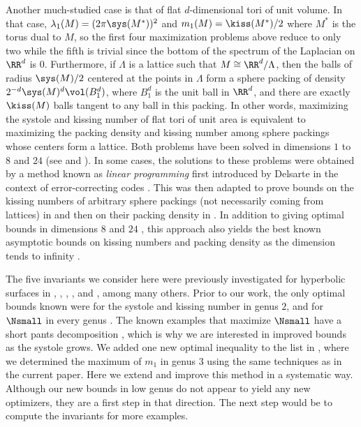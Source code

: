 \documentclass[12pt]{amsart}
\numberwithin{equation}{section}
\begin{document}
Another much-studied case is that of flat $d$-dimensional tori of unit volume. In that case, $\lambda_1(M)=(2\pi \sys(M^*))^2$ and $m_1(M)=\kiss(M^*)/2$ where $M^*$ is the torus dual to $M$, so the first four maximization problems above reduce to only two while the fifth is trivial since the bottom of the spectrum of the Laplacian on $\RR^d$ is $0$. Furthermore, if $\Lambda$ is a lattice such that $M \cong \RR^d / \Lambda$, then the balls of radius $\sys(M)/2$ centered at the points in $\Lambda$ form a sphere packing of density $2^{-d}\sys(M)^d \vol(B_1^d)$, where $B_1^d$ is the unit ball in $\RR^d$, and there are exactly $\kiss(M)$ balls tangent to any ball in this packing. In other words, maximizing the systole and kissing number of flat tori of unit area is equivalent to maximizing the packing density and kissing number among sphere packings whose centers form a lattice. Both problems have been solved in dimensions $1$ to $8$ and $24$ (see \cite[Table 1.1]{ConwaySloane} and \cite{CohnKumar}). In some cases, the solutions to these problems were obtained by a method known as \emph{linear programming} first introduced by Delsarte in the context of error-correcting codes \cite{Delsarte}. This was then adapted to prove bounds on the kissing numbers of arbitrary sphere packings (not necessarily coming from lattices) in \cite{DGS} and then on their packing density in \cite{CohnElkies}. In addition to giving optimal bounds in dimensions $8$ \cite{Viazovska} and $24$ \cite{CKMRV}, this approach also yields the best known asymptotic bounds on kissing numbers and packing density as the dimension tends to infinity \cite{CohnZhao}.

The five invariants we consider here were previously investigated for hyperbolic surfaces in \cite{SchmutzMaxima, BuserSarnak, Bavard}, \cite{SchmutzKissing, Schmutz43, Parlier}, \cite{Cheng, HideMagee, bootstrap}, 
\cite{CCV, LetrouitMachado}, and \cite{HuberSmallEigs,OtalRosas}, among many others. Prior to our work, the only optimal bounds known were for the systole \cite{Jenni} and kissing number \cite{SchmutzKissing} in genus $2$, and for $\Nsmall$ in every genus \cite{OtalRosas}. The known examples that ma\-xi\-mize $\Nsmall$ have a short pants decomposition \cite{Buser14}, which is why we are interested in improved bounds as the systole grows. We added one new optimal inequality to the list in \cite{Klein}, where we determined the maximum of $m_1$ in genus $3$ using the same techniques as in the current paper. Here we extend and improve this method in a systematic way. Although our new bounds in low genus do not appear to yield any new optimizers, they are a first step in that direction. The next step would be to compute the invariants for more examples.
\end{document}
